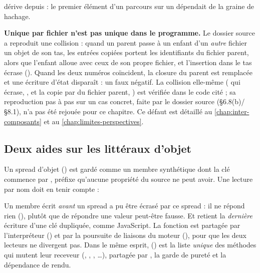  dérive  depuis  : le premier élément d'un parcours sur un  dépendait de la graine de hachage.

\begin{piege}
\textbf{\og Unique par fichier\fg{} n'est pas \og unique dans le programme\fg{}.} Le dossier source a reproduit une collision : quand un parent passe à un enfant d'un \emph{autre} fichier un objet de son tas, les entrées copiées portent les identifiants du fichier parent, alors que l'enfant alloue avec ceux de son propre fichier, et l'insertion dans le tas écrase (). Quand les deux numéros coïncident, la closure du parent est remplacée et une écriture d'état disparaît : un faux négatif. La collision elle-même ( qui écrase, , et la copie par  du fichier parent, ) est vérifiée dans le code cité ; sa reproduction pas à pas sur un cas concret, faite par le dossier source (§6.8(b)/§8.1), n'a pas été rejouée pour ce chapitre. Ce défaut est détaillé au \cref{chap:inter-composants} et au \cref{chap:limites-perspectives}.
\end{piege}

\subsection{Deux aides sur les littéraux d'objet}

Un spread d'objet () est gardé comme un membre synthétique dont la clé commence par , préfixe qu'aucune propriété du source ne peut avoir. Une lecture par nom doit en tenir compte :


Un membre écrit \emph{avant} un spread a pu être écrasé par ce spread : il \og ne répond rien\fg{} (), plutôt que de répondre une valeur peut-être fausse. Et  retient la \emph{dernière} écriture d'une clé dupliquée, comme JavaScript. La fonction est partagée par l'interpréteur () et par la poursuite de liaisons du moteur (), pour que les deux lecteurs ne divergent pas. Dans le même esprit,  () est la liste \emph{unique} des méthodes qui mutent leur receveur (, , , \ldots), partagée par , la garde de pureté et la dépendance de rendu.

